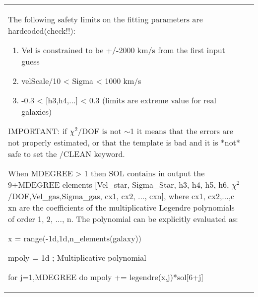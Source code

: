 \begin{center}
\begin{longtable}{p{2.7cm}| p{11.1cm}}
       The following safety limits on the fitting parameters are hardcoded(check!!):
      \begin{enumerate}
         \item Vel is constrained to be +/-2000 km/s from the first input guess
         \item velScale/10 < Sigma < 1000 km/s
         \item -0.3 < [h3,h4,...] < 0.3 (limits are extreme value for real galaxies)
           \end{enumerate}

       IMPORTANT: if $\chi^2$/DOF is not $\sim$1 it means that the errors are not
       properly estimated, or that the template is bad and it is *not* safe
       to set the /CLEAN keyword.

      When MDEGREE > 1 then SOL contains in output the 9+MDEGREE elements
       [Vel\_star, Sigma\_Star, h3, h4, h5, h6,  $\chi^2$/DOF,Vel\_gas,Sigma\_gas, 
       cx1, cx2, ..., cxn], where cx1, cx2,...,c xn
       are the coefficients of the multiplicative Legendre polynomials
       of order 1, 2, ..., n. The polynomial can be explicitly evaluated as:

           x = range(-1d,1d,n\_elements(galaxy))

           mpoly = 1d ; Multiplicative polynomial

           for j=1,MDEGREE do mpoly += legendre(x,j)*sol[6+j]


\end{longtable}
\end{center}
